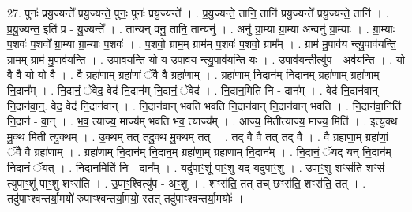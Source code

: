 \documentclass[17pt]{extarticle}
\begin{document}
27. पुनः॑ प्रयु॒ज्यन्ते᳚ प्रयु॒ज्यन्ते॒ पुनः॒ पुनः॑ प्रयु॒ज्यन्ते᳚ । . प्र॒यु॒ज्यन्ते॒ तानि॒ तानि॑ प्रयु॒ज्यन्ते᳚ प्रयु॒ज्यन्ते॒ तानि॑ । . प्र॒यु॒ज्यन्त॒ इति॑ प्र - यु॒ज्यन्ते᳚ । . तान्यन् वनु॒ तानि॒ तान्यनु॑ । . अनु॑ ग्रा॒म्या ग्रा॒म्या अन्वनु॑ ग्रा॒म्याः । . ग्रा॒म्याः प॒शवः॑ प॒शवो᳚ ग्रा॒म्या ग्रा॒म्याः प॒शवः॑ । . प॒शवो॒ ग्राम॒म् ग्राम॑म् प॒शवः॑ प॒शवो॒ ग्राम᳚म् । . ग्राम॑ मु॒पाव॑य न्त्यु॒पाव॑यन्ति॒ ग्राम॒म् ग्राम॑ मु॒पाव॑यन्ति । . उ॒पाव॑यन्ति॒ यो य उ॒पाव॑य न्त्यु॒पाव॑यन्ति॒ यः । . उ॒पाव॑य॒न्तीत्यु॑प - अव॑यन्ति । . यो वै वै यो यो वै । . वै ग्रहा॑णा॒म् ग्रहा॑णां॒ ॅवै वै ग्रहा॑णाम् । . ग्रहा॑णाम् नि॒दान॑म् नि॒दान॒म् ग्रहा॑णा॒म् ग्रहा॑णाम् नि॒दान᳚म् । . नि॒दानं॒ ॅवेद॒ वेद॑ नि॒दान॑म् नि॒दानं॒ ॅवेद॑ । . नि॒दान॒मिति॑ नि - दान᳚म् । . वेद॑ नि॒दान॑वान् नि॒दान॑वा॒न्॒. वेद॒ वेद॑ नि॒दान॑वान् । . नि॒दान॑वान् भवति भवति नि॒दान॑वान् नि॒दान॑वान् भवति । . नि॒दान॑वा॒निति॑ नि॒दान॑ - वा॒न् । . भ॒व॒ त्याज्य॒ माज्य॑म् भवति भव॒ त्याज्य᳚म् । . आज्य॒ मितीत्याज्य॒ माज्य॒ मिति॑ । . इत्यु॒क्थ मु॒क्थ मिती त्यु॒क्थम् । . उ॒क्थम् तत् तदु॒क्थ मु॒क्थम् तत् । . तद् वै वै तत् तद् वै । . वै ग्रहा॑णा॒म् ग्रहा॑णां॒ ॅवै वै ग्रहा॑णाम् । . ग्रहा॑णाम् नि॒दान॑म् नि॒दान॒म् ग्रहा॑णा॒म् ग्रहा॑णाम् नि॒दान᳚म् । . नि॒दानं॒ ॅयद् यन् नि॒दान॑म् नि॒दानं॒ ॅयत् । . नि॒दान॒मिति॑ नि - दान᳚म् । . यदु॑पाꣳ॒॒शू॑ पाꣳ॒॒शु यद् यदु॑पाꣳ॒॒शु । . उ॒पाꣳ॒॒शु शꣳस॑ति॒ शꣳस॑ त्युपाꣳ॒॒शू॑ पाꣳ॒॒शु शꣳस॑ति । . उ॒पाꣳ॒॒श्वित्यु॑प - अꣳ॒॒शु । . शꣳस॑ति॒ तत् तच् छꣳस॑ति॒ शꣳस॑ति॒ तत् । . तदु॑पाꣳश्वन्तर्या॒मयो॑ रुपाꣳश्वन्तर्या॒मयो॒ स्तत् तदु॑पाꣳश्वन्तर्या॒मयोः᳚ । \newline
\end{document}
